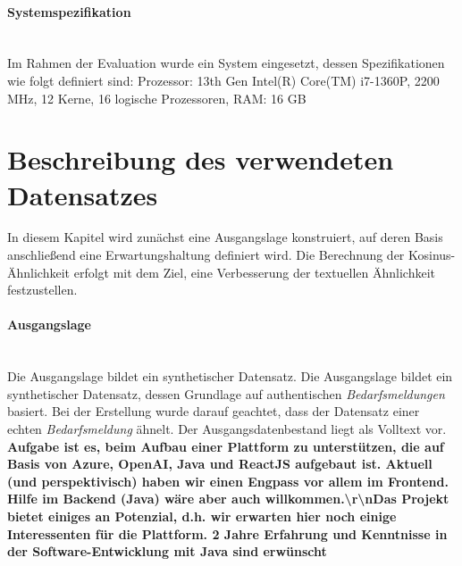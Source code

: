 \paragraph{Systemspezifikation}\mbox{}\\
Im Rahmen der Evaluation wurde ein System eingesetzt, dessen Spezifikationen wie folgt definiert sind: Prozessor: 13th Gen Intel(R) Core(TM) i7-1360P, 2200 MHz, 12 Kerne, 16 logische Prozessoren, RAM: 16 GB
\section{Beschreibung des verwendeten Datensatzes}
In diesem Kapitel wird zunächst eine Ausgangslage konstruiert, auf deren Basis anschließend eine Erwartungshaltung definiert wird. Die Berechnung der Kosinus-Ähnlichkeit erfolgt mit dem Ziel, eine Verbesserung der textuellen Ähnlichkeit festzustellen.
\paragraph{Ausgangslage}\mbox{}\\
Die Ausgangslage bildet ein synthetischer Datensatz. Die Ausgangslage bildet ein synthetischer Datensatz, dessen Grundlage auf authentischen \emph{Bedarfsmeldungen} basiert. Bei der Erstellung wurde darauf geachtet, dass der Datensatz einer echten \emph{Bedarfsmeldung} ähnelt. Der Ausgangsdatenbestand liegt als Volltext vor.\\

\textbf{Aufgabe ist es, beim Aufbau einer Plattform zu unterstützen, die auf Basis von Azure, OpenAI, Java und ReactJS aufgebaut ist. Aktuell (und perspektivisch) haben wir einen Engpass vor allem im Frontend. Hilfe im Backend (Java) wäre aber auch willkommen.\textbackslash r\textbackslash nDas Projekt bietet einiges an Potenzial, d.h. wir erwarten hier noch einige Interessenten für die Plattform. 2 Jahre Erfahrung und Kenntnisse in der Software-Entwicklung mit Java sind erwünscht}\\

